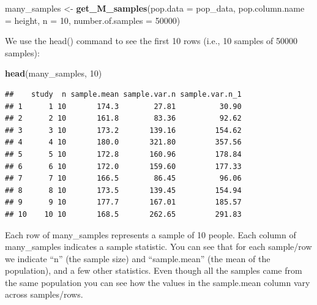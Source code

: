 \documentclass[
]{krantz}
\makeatletter
\newenvironment{Shaded}{\begin{snugshade}}{\end{snugshade}}
\newcommand{\DataTypeTok}[1]{\textcolor[rgb]{0.27,0.27,0.27}{#1}}
\newcommand{\DecValTok}[1]{\textcolor[rgb]{0.06,0.06,0.06}{#1}}
\newcommand{\KeywordTok}[1]{\textcolor[rgb]{0.27,0.27,0.27}{\textbf{#1}}}
\newcommand{\NormalTok}[1]{#1}
\newcommand{\StringTok}[1]{\textcolor[rgb]{0.5,0.5,0.5}{#1}}
\newenvironment{kframe}{%
\medskip{}
\setlength{\fboxsep}{.8em}
 \def\at@end@of@kframe{}%
 \ifinner\ifhmode%
  \def\at@end@of@kframe{\end{minipage}}%
  \begin{minipage}{\columnwidth}%
 \fi\fi%
 \def\FrameCommand##1{\hskip\@totalleftmargin \hskip-\fboxsep
 \colorbox{shadecolor}{##1}\hskip-\fboxsep
     \hskip-\linewidth \hskip-\@totalleftmargin \hskip\columnwidth}%
 \MakeFramed {\advance\hsize-\width
   \@totalleftmargin\z@ \linewidth\hsize
   \@setminipage}}%
 {\par\unskip\endMakeFramed%
 \at@end@of@kframe}
\renewenvironment{Shaded}{\begin{kframe}}{\end{kframe}}
\makeatother
\begin{document}
\begin{Shaded}
\begin{Highlighting}[]
\NormalTok{many_samples <-}\StringTok{ }\KeywordTok{get_M_samples}\NormalTok{(}\DataTypeTok{pop.data =}\NormalTok{ pop_data, }
                              \DataTypeTok{pop.column.name =}\NormalTok{ height,}
                              \DataTypeTok{n =} \DecValTok{10}\NormalTok{,}
                              \DataTypeTok{number.of.samples =} \DecValTok{50000}\NormalTok{)}
\end{Highlighting}
\end{Shaded}

We use the head() command to see the first 10 rows (i.e., 10 samples of 50000 samples):

\begin{Shaded}
\begin{Highlighting}[]
\KeywordTok{head}\NormalTok{(many_samples, }\DecValTok{10}\NormalTok{)}
\end{Highlighting}
\end{Shaded}

\begin{verbatim}
##    study  n sample.mean sample.var.n sample.var.n_1
## 1      1 10       174.3        27.81          30.90
## 2      2 10       161.8        83.36          92.62
## 3      3 10       173.2       139.16         154.62
## 4      4 10       180.0       321.80         357.56
## 5      5 10       172.8       160.96         178.84
## 6      6 10       172.0       159.60         177.33
## 7      7 10       166.5        86.45          96.06
## 8      8 10       173.5       139.45         154.94
## 9      9 10       177.7       167.01         185.57
## 10    10 10       168.5       262.65         291.83
\end{verbatim}

Each row of many\_samples represents a sample of 10 people. Each column of many\_samples indicates a sample statistic. You can see that for each sample/row we indicate ``n'' (the sample size) and ``sample.mean'' (the mean of the population), and a few other statistics. Even though all the samples came from the same population you can see how the values in the sample.mean column vary across samples/rows.
\end{document}
